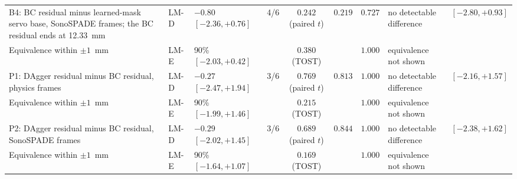\begin{table}[tp]
\begin{tabularx}{\textwidth}{@{}>{\raggedright\arraybackslash}X l l c c c c >{\raggedright\arraybackslash}p{} l@{}}
\quad B4: BC residual minus learned-mask servo base, SonoSPADE frames; the BC residual ends at 12.33~mm & LM-D & $-0.80$ $[-2.36, +0.76]$ & 4/6 & $0.242$ (paired $t$) & $0.219$ & $0.727$ & no detectable difference & $[-2.80, +0.93]$ \\
\quad\quad Equivalence within $\pm 1$~mm & LM-E & 90\% $[-2.03, +0.42]$ & & $0.380$ (TOST) & & $1.000$ & equivalence not shown & \\
\quad P1: DAgger residual minus BC residual, physics frames & LM-D & $-0.27$ $[-2.47, +1.94]$ & 3/6 & $0.769$ (paired $t$) & $0.813$ & $1.000$ & no detectable difference & $[-2.16, +1.57]$ \\
\quad\quad Equivalence within $\pm 1$~mm & LM-E & 90\% $[-1.99, +1.46]$ & & $0.215$ (TOST) & & $1.000$ & equivalence not shown & \\
\quad P2: DAgger residual minus BC residual, SonoSPADE frames & LM-D & $-0.29$ $[-2.02, +1.45]$ & 3/6 & $0.689$ (paired $t$) & $0.844$ & $1.000$ & no detectable difference & $[-2.38, +1.62]$ \\
\quad\quad Equivalence within $\pm 1$~mm & LM-E & 90\% $[-1.64, +1.07]$ & & $0.169$ (TOST) & & $1.000$ & equivalence not shown & \\
\bottomrule
\end{tabularx}
\end{table}
